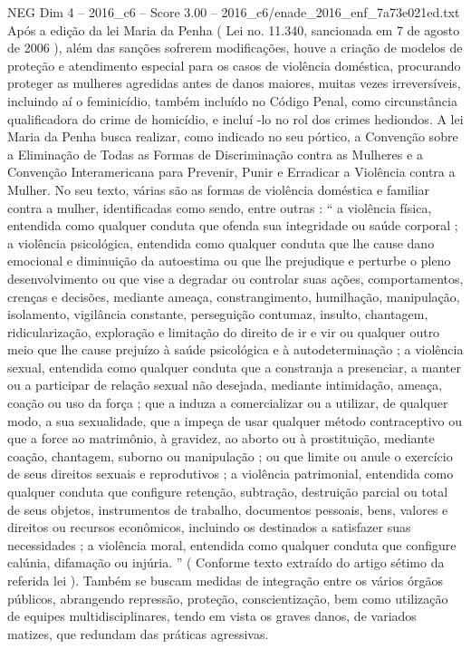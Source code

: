 \begin{textsample}{NEG Dim 4 – 2016\_c6 – Score 3.00 – 2016\_c6/enade\_2016\_enf\_7a73e021ed.txt}
Após a edição da lei Maria da Penha ( Lei no. 11.340, sancionada em 7 de agosto de 2006 ), além das sanções sofrerem modificações, houve a criação de modelos de proteção e atendimento especial para os casos de violência doméstica, procurando proteger as mulheres agredidas antes de danos maiores, muitas vezes irreversíveis, incluindo aí o feminicídio, também incluído no Código Penal, como circunstância qualificadora do crime de homicídio, e incluí -lo no rol dos crimes hediondos.
A lei Maria da Penha busca realizar, como indicado no seu pórtico, a Convenção sobre a Eliminação de Todas as Formas de Discriminação contra as Mulheres e a Convenção Interamericana para Prevenir, Punir e Erradicar a Violência contra a Mulher.
No seu texto, várias são as formas de violência doméstica e familiar contra a mulher, identificadas como sendo, entre outras : “ a violência física, entendida como qualquer conduta que ofenda sua integridade ou saúde corporal ; a violência psicológica, entendida como qualquer conduta que lhe cause dano emocional e diminuição da autoestima ou que lhe prejudique e perturbe o pleno desenvolvimento ou que vise a degradar ou controlar suas ações, comportamentos, crenças e decisões, mediante ameaça, constrangimento, humilhação, manipulação, isolamento, vigilância constante, perseguição contumaz, insulto, chantagem, ridicularização, exploração e limitação do direito de ir e vir ou qualquer outro meio que lhe cause prejuízo à saúde psicológica e à autodeterminação ; a violência sexual, entendida como qualquer conduta que a constranja a presenciar, a manter ou a participar de relação sexual não desejada, mediante intimidação, ameaça, coação ou uso da força ; que a induza a comercializar ou a utilizar, de qualquer modo, a sua sexualidade, que a impeça de usar qualquer método contraceptivo ou que a force ao matrimônio, à gravidez, ao aborto ou à prostituição, mediante coação, chantagem, suborno ou manipulação ; ou que limite ou anule o exercício de seus direitos sexuais e reprodutivos ; a violência patrimonial, entendida como qualquer conduta que configure retenção, subtração, destruição parcial ou total de seus objetos, instrumentos de trabalho, documentos pessoais, bens, valores e direitos ou recursos econômicos, incluindo os destinados a satisfazer suas necessidades ; a violência moral, entendida como qualquer conduta que configure calúnia, difamação ou injúria. ” ( Conforme texto extraído do artigo sétimo da referida lei ).
Também se buscam medidas de integração entre os vários órgãos públicos, abrangendo repressão, proteção, conscientização, bem como utilização de equipes multidisciplinares, tendo em vista os graves danos, de variados matizes, que redundam das práticas agressivas.

\end{textsample}
